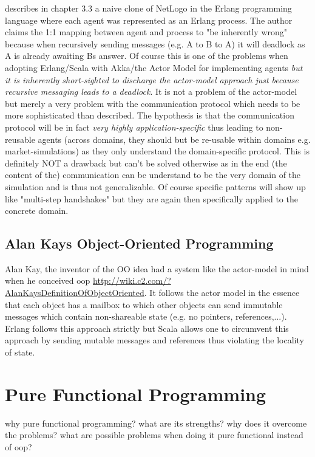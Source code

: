 \cite{bezirgiannis_improving_2013} describes in chapter 3.3 a naive clone of NetLogo in the Erlang programming language where each agent was represented as an Erlang process. The author claims the 1:1 mapping between agent and process to "be inherently wrong" because when recursively sending messages (e.g. A to B to A) it will deadlock as A is already awaiting Bs answer. Of course this is one of the problems when adopting Erlang/Scala with Akka/the Actor Model for implementing agents \textit{but it is inherently short-sighted to discharge the actor-model approach just because recursive messaging leads to a deadlock}. It is not a problem of the actor-model but merely a very problem with the communication protocol which needs to be more sophisticated than \cite{bezirgiannis_improving_2013} described. The hypothesis is that the communication protocol will be in fact \textit{very highly application-specific} thus leading to non-reusable agents (across domains, they should but be re-usable within domains e.g. market-simulations) as they only understand the domain-specific protocol. This is definitely NOT a drawback but can't be solved otherwise as in the end (the content of the) communication can be understand to be the very domain of the simulation and is thus not generalizable. Of course specific patterns will show up like "multi-step handshakes" but they are again then specifically applied to the concrete domain.

\subsection{Alan Kays Object-Oriented Programming}
Alan Kay, the inventor of the OO idea had a system like the actor-model in mind when he conceived oop \url{http://wiki.c2.com/?AlanKaysDefinitionOfObjectOriented}. It follows the actor model in the essence that each object has a mailbox to which other objects can send immutable messages which contain non-shareable state (e.g. no pointers, references,...). Erlang follows this approach strictly but Scala allows one to circumvent this approach by sending mutable messages and references thus violating the locality of state.\\

\section{Pure Functional Programming}
why pure functional programming? what are its strengths? why does it overcome the problems? what are possible problems when doing it pure functional instead of oop?

